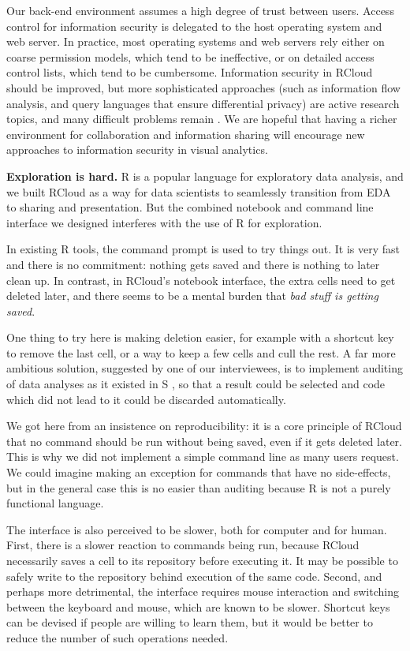 Our back-end environment assumes a high degree of trust between users.
Access control for information security is delegated to the host
operating system and web server. In practice, most operating
systems and web servers rely either on coarse permission models,
which tend to be ineffective, or on detailed access control
lists, which tend to be cumbersome.
Information security in RCloud should be improved, but more
sophisticated approaches (such as information flow analysis,
and query languages that ensure differential privacy) are
active research topics, and many difficult problems remain
\cite{Moore:2011:SAF}. We are hopeful that having a richer
environment for collaboration and information sharing will encourage
new approaches to information security in visual analytics.

{\bf Exploration is hard.}
R is a popular language for exploratory data analysis, and we built RCloud
as a way for data scientists to seamlessly transition from EDA to sharing
and presentation. But the combined notebook and command line interface we
designed interferes with the use of R for exploration.

In existing R tools, the command prompt is used to try things out. It is very
fast and there is no commitment: nothing gets saved and there is nothing to
later clean up. In contrast, in RCloud's notebook interface, the extra cells need
to get deleted later, and there seems to be a mental burden that \emph{bad stuff
is getting saved}.

One thing to try here is making deletion easier, for example with a
shortcut key to remove the last cell, or a way to keep a few cells and cull
the rest. A far more ambitious solution, suggested by one of our
interviewees, is to implement auditing of data analyses as it existed in S
\cite{Becker:1988:Auditing}, so that a result could be selected and code
which did not lead to it could be discarded automatically.

We got here from an insistence on reproducibility: it is a core principle
of RCloud that no command should be run without being saved, even if it
gets deleted later. This is why we did not implement a simple command line
as many users request. We could imagine making an exception for commands
that have no side-effects, but in the general case this is no easier than
auditing because R is not a purely functional language.

The interface is also perceived to be slower, both for computer and for
human. First, there is a slower reaction to commands being run, because
RCloud necessarily saves a cell to its repository before executing it. It
may be possible to safely write to the repository behind execution of the
same code. Second, and perhaps more detrimental, the interface requires
mouse interaction and switching between the keyboard and mouse, which are
known to be slower.  Shortcut keys can be devised if people are willing
to learn them, but it would be better to reduce the number of such
operations needed.

